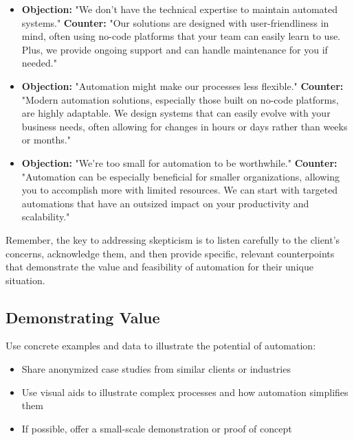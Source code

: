 \begin{itemize}
    \item \textbf{Objection:} "We don't have the technical expertise to maintain automated systems."
    \textbf{Counter:} "Our solutions are designed with user-friendliness in mind, often using no-code platforms that your team can easily learn to use. Plus, we provide ongoing support and can handle maintenance for you if needed."

    \item \textbf{Objection:} "Automation might make our processes less flexible."
    \textbf{Counter:} "Modern automation solutions, especially those built on no-code platforms, are highly adaptable. We design systems that can easily evolve with your business needs, often allowing for changes in hours or days rather than weeks or months."

    \item \textbf{Objection:} "We're too small for automation to be worthwhile."
    \textbf{Counter:} "Automation can be especially beneficial for smaller organizations, allowing you to accomplish more with limited resources. We can start with targeted automations that have an outsized impact on your productivity and scalability."
\end{itemize}

Remember, the key to addressing skepticism is to listen carefully to the client's concerns, acknowledge them, and then provide specific, relevant counterpoints that demonstrate the value and feasibility of automation for their unique situation.


\subsection{Demonstrating Value}

Use concrete examples and data to illustrate the potential of automation:

\begin{itemize}
    \item Share anonymized case studies from similar clients or industries
    \item Use visual aids to illustrate complex processes and how automation simplifies them
    \item If possible, offer a small-scale demonstration or proof of concept
\end{itemize}


